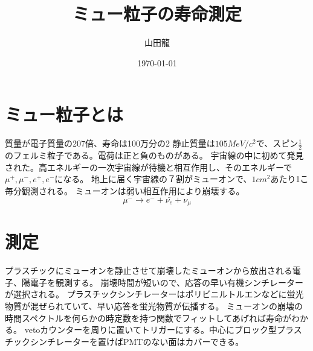 \documentclass{jsarticle}
\date{\today}
\author{山田龍}
\title{ミュー粒子の寿命測定}
\newcommand{\half}{\frac{1}{2}}
\newcommand{\beq}{\begin{equation}}
\newcommand{\eeq}{\end{equation}}
\begin{document}
\maketitle
\section{ミュー粒子とは}
質量が電子質量の207倍、寿命は100万分の2
静止質量は$105MeV/c^2$で、スピン$\half$のフェルミ粒子である。電荷は正と負のものがある。
宇宙線の中に初めて発見された。高エネルギーの一次宇宙線が待機と相互作用し、そのエネルギーで$\mu^+,\mu^-,e^+,e^-$になる。
地上に届く宇宙線の７割がミューオンで、$1cm^2$あたり1こ毎分観測される。
ミューオンは弱い相互作用により崩壊する。
\beq
\mu^- \rightarrow e^- + \bar{\nu_e} + \nu_\mu
\eeq
\section{測定}
プラスチックにミューオンを静止させて崩壊したミューオンから放出される電子、陽電子を観測する。
崩壊時間が短いので、応答の早い有機シンチレーターが選択される。
プラスチックシンチレーターはポリビニルトルエンなどに蛍光物質が混ぜられていて、早い応答を蛍光物質が伝播する。
ミューオンの崩壊の時間スペクトルを何らかの時定数を持つ関数でフィットしてあげれば寿命がわかる。
vetoカウンターを周りに置いてトリガーにする。中心にブロック型プラスチックシンチレーターを置けばPMTのない面はカバーできる。
\end{document}
